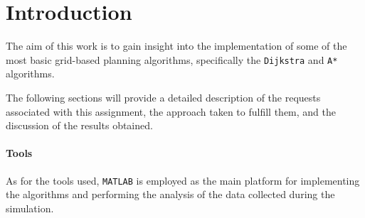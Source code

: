 \section{Introduction}
\label{sec:introduction}

The aim of this work is to gain insight into the implementation of some of the most basic grid-based planning algorithms, specifically the \texttt{Dijkstra} and \texttt{A*} algorithms.

The following sections will provide a detailed description of the requests associated with this assignment, the approach taken to fulfill them, and the discussion of the results obtained.

\paragraph{Tools}

As for the tools used, \texttt{MATLAB} is employed as the main platform for implementing the algorithms and performing the analysis of the data collected during the simulation.